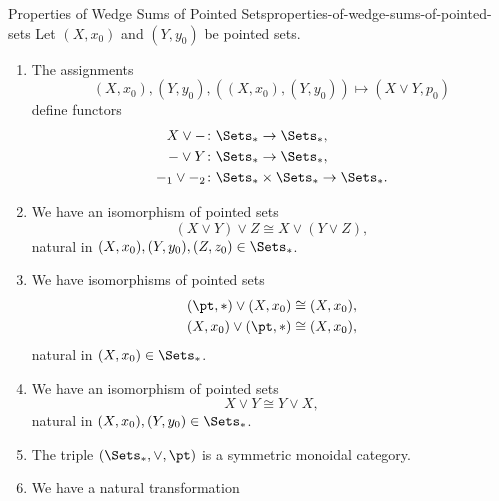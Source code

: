 \begin{proposition}{Properties of Wedge Sums of Pointed Sets}{properties-of-wedge-sums-of-pointed-sets}%
    Let $(X,x_{0})$ and $(Y,y_{0})$ be pointed sets.
    \begin{enumerate}
        \item\label{properties-of-wedge-sums-of-pointed-sets-functoriality}The assignments
            \[
                (X,x_{0}),(Y,y_{0}),((X,x_{0}),(Y,y_{0}))\mapsto(X\vee Y,p_{0})%
            \]%
            define functors
            \begin{align*}
                X\vee-         &\colon \Sets_{*}                \to \Sets_{*},\\
                -\vee Y        &\colon \Sets_{*}                \to \Sets_{*},\\
                -_{1}\vee-_{2} &\colon \Sets_{*}\times\Sets_{*} \to \Sets_{*}.
            \end{align*}
        \item\label{properties-of-wedge-sums-of-pointed-sets-associativity}We have an isomorphism of pointed sets
            \[
                (X\vee Y)\vee Z%
                \cong%
                X\vee(Y\vee Z),%
            \]%
            natural in $(X,x_{0}),(Y,y_{0}),(Z,z_{0})\in\Sets_{*}$.
        \item\label{properties-of-wedge-sums-of-pointed-sets-unitality}We have isomorphisms of pointed sets
            \begin{align*}
                (\pt,*)\vee (X,x_{0}) &\cong (X,x_{0}),\\%
                (X,x_{0})\vee(\pt,*)  &\cong (X,x_{0}),%
            \end{align*}
            natural in $(X,x_{0})\in\Sets_{*}$.
        \item\label{properties-of-wedge-sums-of-pointed-sets-commutativity}We have an isomorphism of pointed sets
            \[
                X\vee Y
                \cong
                Y\vee X,
            \]%
            natural in $(X,x_{0}),(Y,y_{0})\in\Sets_{*}$.
        \item\label{properties-of-wedge-sums-of-pointed-sets-symmetric-monoidality}The triple $(\Sets_{*},\vee,\pt)$ is a symmetric monoidal category.
        \item\label{properties-of-wedge-sums-of-pointed-sets-the-fold-map}We have a natural transformation

\end{enumerate}
\end{proposition}

